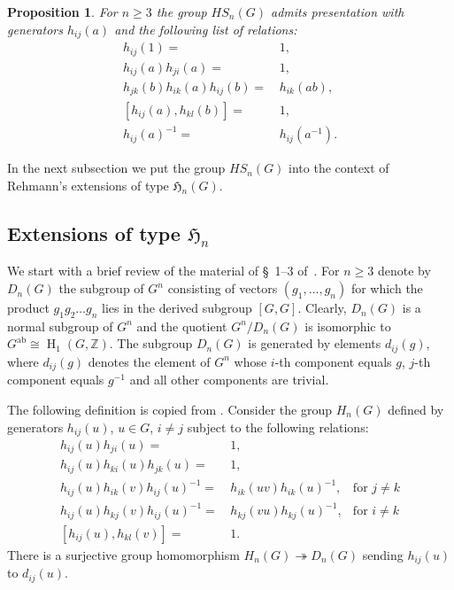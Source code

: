 \documentclass[oneside, 10pt]{amsart}
\theoremstyle{plain}
\numberwithin{equation}{section}
\numberwithin{lemma}{section}
\newtheorem{prop}[lemma]{Proposition}
\theoremstyle{remark}
\theoremstyle{definition}
\DeclareMathOperator{\HH}{H}
\newcommand{\ZZ}{\mathbb{Z}}
\begin{document}
\begin{prop} \label{prop:HSpres} For $n\geq 3$ the group $HS_n(G)$ admits presentation with generators $h_{ij}(a)$ and the following list of relations:
\begin{align}
h_{ij}(1)                     = &\, 1,              \tag{R0} \label{H0} \\
h_{ij}(a) h_{ji}(a)           = &\, 1,              \tag{R1} \label{H1} \\
h_{jk}(b) h_{ik}(a) h_{ij}(b) = &\, h_{ik}(ab),     \tag{R2} \label{H2} \\
[h_{ij}(a), h_{kl}(b)]        = &\, 1,              \tag{R3} \label{H3} \\
h_{ij}(a)^{-1}                = &\, h_{ij}(a^{-1}). \tag{R4} \label{H4}
\end{align}
\end{prop}

In the next subsection we put the group $HS_n(G)$ into the context of Rehmann's extensions of type $\mathfrak{H}_n(G)$.
\subsection{Extensions of type $\mathfrak{H}_n$}
We start with a brief review of the material of \S~1--3 of~\cite{Reh78}.
For $n\geq 3$ denote by $D_n(G)$ the subgroup of $G^n$ consisting of vectors
$(g_1,\ldots, g_n)$ for which the product $g_1 g_2 \ldots g_n$ lies in the derived subgroup $[G, G]$.
Clearly, $D_n(G)$ is a normal subgroup of $G^n$ and the quotient $G^n/D_n(G)$ is isomorphic to $G^{\mathrm{ab}}\cong \HH_1(G, \ZZ)$.
The subgroup $D_n(G)$ is generated by elements $d_{ij}(g)$, where $d_{ij}(g)$ denotes the element of $G^n$ whose
 $i$-th component equals $g$, $j$-th component equals $g^{-1}$ and all other components are trivial.

The following definition is copied from \cite[\S~2]{Reh78}.
Consider the group $H_n(G)$ defined by generators $h_{ij}(u)$, $u\in G$, $i\neq j$ subject to the following relations:
\begin{align}
h_{ij}(u) h_{ji}(u)                = &\, 1,                        &                     \tag{H1} \label{RH1} \\
h_{ij}(u) h_{ki}(u) h_{jk}(u)      = &\, 1,                        &                     \tag{H2} \label{RH2} \\
h_{ij}(u) h_{ik}(v) h_{ij}(u)^{-1} = &\, h_{ik}(uv) h_{ik}(u)^{-1},& \text{for } j\neq k \tag{H3} \label{RH3} \\
h_{ij}(u) h_{kj}(v) h_{ij}(u)^{-1} = &\, h_{kj}(vu) h_{kj}(u)^{-1},& \text{for } i\neq k \tag{H4} \label{RH4} \\
[h_{ij}(u), h_{kl}(v)]             = &\, 1.                        &                     \tag{H5} \label{RH5} \end{align}
There is a surjective group homomorphism $H_n(G) \twoheadrightarrow D_n(G)$ sending $h_{ij}(u)$ to $d_{ij}(u)$.
\end{document}
